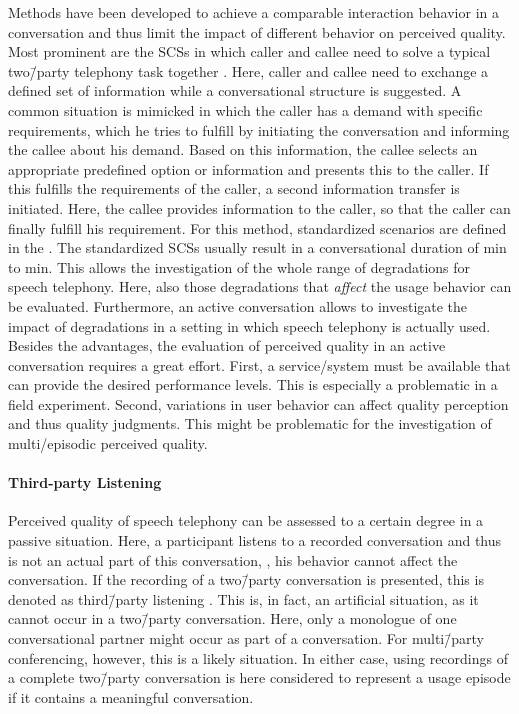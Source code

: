 Methods have been developed to achieve a comparable interaction behavior in a conversation and thus limit the impact of different behavior on perceived quality.
Most prominent are the \acfp{SCS} in which caller and callee need to solve a typical two\=/party telephony task together \citep[][p.\,76]{moller_assessment_2000}.
Here, caller and callee need to exchange a defined set of information while a conversational structure is suggested.
A common situation is mimicked in which the caller has a demand with specific requirements, which he tries to fulfill by initiating the conversation and informing the callee about his demand.
Based on this information, the callee selects an appropriate predefined option or information and presents this to the caller.
If this fulfills the requirements of the caller, a second information transfer is initiated.
Here, the callee provides information to the caller, so that the caller can finally fulfill his requirement.
For this method, standardized scenarios are defined in the \citet{itu-t_recommendation_p.805_subjective_2007}.
The standardized \acp{SCS} usually result in a conversational duration of \unit[3]{min} to \unit[7]{min}.
This allows the investigation of the whole range of degradations for speech telephony.
Here, also those degradations that \emph{affect} the usage behavior can be evaluated. %
Furthermore, an active conversation allows to investigate the impact of degradations in a setting in which speech telephony is actually used.
Besides the advantages, the evaluation of perceived quality in an active conversation requires a great effort.
First, a service/system must be available that can provide the desired performance levels.
This is especially a problematic in a field experiment.
Second, variations in user behavior can affect quality perception and thus quality judgments.
This might be problematic for the investigation of multi\-/episodic perceived quality.

\paragraph*{Third-party Listening}
Perceived quality of speech telephony can be assessed  to a certain degree in a passive situation.
Here, a participant listens to a recorded conversation and thus is not an actual part of this conversation, \ie, his behavior cannot affect the conversation.
If the recording of a two\=/party conversation is presented, this is denoted as third\=/party listening \citep[][p.\,13]{itu-t_recommendation_p.832_subjective_2000}.
This is, in fact, an artificial situation, as it cannot occur in a two\=/party conversation.
Here, only a monologue of one conversational partner might occur as part of a conversation.
For multi\=/party conferencing, however, this is a likely situation.
In either case, using recordings of a complete two\=/party conversation is here considered to represent a usage episode if it contains a meaningful conversation.

